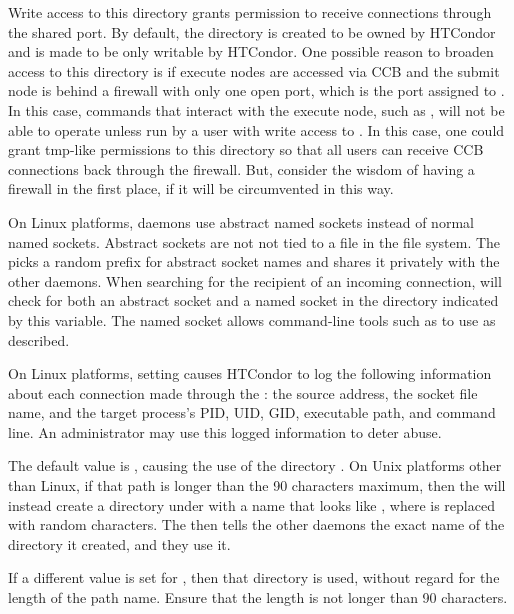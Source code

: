 \begin{description}
  Write access to this directory grants permission to receive
  connections through the shared port.  By default, the directory is
  created to be owned by HTCondor and is made to be only writable by
  HTCondor.  One possible reason to broaden access to this directory is
  if execute nodes are accessed via CCB and the submit node is behind a
  firewall with only one open port,
  which is the port assigned to .
  In this case, commands that interact with the execute node, 
  such as ,
  will not be able to operate unless run by a user with write access to
  .  In this case, one could grant
  tmp-like permissions to this directory so that all users can receive
  CCB connections back through the firewall.
  But, consider the wisdom of having a firewall in the first place,
  if it will be circumvented in this way.

  On Linux platforms, 
  daemons use abstract named sockets instead of normal named sockets.
  Abstract sockets are not not tied to a file in the file system.
  The  picks a random prefix for abstract socket names
  and shares it privately with the other daemons.
  When searching for the recipient of an incoming connection,
   will check for both an abstract socket and a
  named socket in the directory indicated by this variable.
  The named socket allows command-line tools such as  to
  use  as described.

  On Linux platforms,
  setting  causes HTCondor to log the
  following information about each connection made through the
  : the source address, the socket file
  name, and the target process's PID, UID, GID, executable path, and
  command line.  An administrator may use this logged information to deter
  abuse.

  The default value is ,
  causing the use of the directory .
  On Unix platforms other than Linux, 
  if that path is longer than the 90 characters maximum,
  then the  will instead create a
  directory under  with a name that looks like
  ,
  where  is replaced with random characters.
  The  then tells the other daemons the exact name of
  the directory it created, and they use it.

  If a different value is set for ,
  then that directory is used, without regard for the length of the path name.
  Ensure that the length is not longer than 90 characters.


\end{description}
